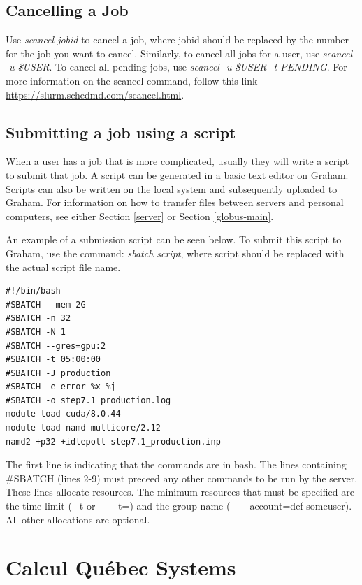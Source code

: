 \documentclass[12pt]{article}
\begin{document}
\subsection{Cancelling a Job}

\quad Use \textit{scancel jobid} to cancel a job, where jobid should be replaced by the number for the job you want to cancel. Similarly, to cancel all jobs for a user, use \textit{scancel -u \$USER}. To cancel all pending jobs, use \textit{scancel -u \$USER -t PENDING}. For more information on the scancel command, follow this link \url{https://slurm.schedmd.com/scancel.html}.

\subsection{Submitting a job using a script}

\quad When a user has a job that is more complicated, usually they will write a script to submit that job. A script can be generated in a basic text editor on Graham. Scripts can also be written on the local system and subsequently uploaded to Graham. For information on how to transfer files between servers and personal computers, see either Section \ref{server} or Section \ref{globus-main}. 

\quad An example of a submission script can be seen below. To submit this script to Graham, use the command: \textit{sbatch script}, where script should be replaced with the actual script file name.

\begin{lstlisting}
#!/bin/bash
#SBATCH --mem 2G
#SBATCH -n 32
#SBATCH -N 1
#SBATCH --gres=gpu:2
#SBATCH -t 05:00:00
#SBATCH -J production
#SBATCH -e error_%x_%j
#SBATCH -o step7.1_production.log
module load cuda/8.0.44
module load namd-multicore/2.12
namd2 +p32 +idlepoll step7.1_production.inp
\end{lstlisting}

\quad The first line is indicating that the commands are in bash. The lines containing \#SBATCH (lines 2-9) must preceed any other commands to be run by the server. These lines allocate resources. The minimum resources that must be specified are the time limit ($-$t or $--$t=) and the group name ($--$account=def-someuser). All other allocations are optional.

\newpage

\section{Calcul Qu\'{e}bec Systems}\label{CalcQ}
\end{document}
